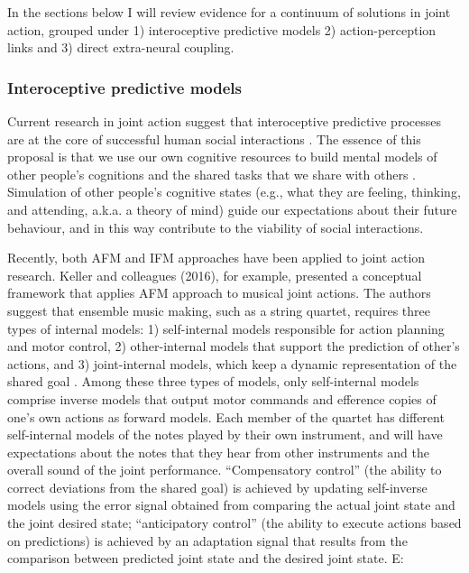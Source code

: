 \begin{CJK}{UTF8}{gbsn}
In the sections below I will review evidence for a continuum of solutions in joint action, grouped under 1) interoceptive predictive models 2) action-perception links and 3) direct extra-neural coupling.


\subsubsection{Interoceptive predictive models\label{sect:interoceptiveModelling}}
Current research in joint action suggest that interoceptive predictive processes are at the core of successful human social interactions \citep{Graziano2013,Manera2013,Sparenberg2012,Springer2012}.  The essence of this proposal is that we use our own cognitive resources to build mental models of other people’s cognitions and the shared tasks that we share with others \citep{Tomasello2005a}.  Simulation of other people’s cognitive states (e.g., what they are feeling, thinking, and attending, a.k.a. a theory of mind) guide our expectations about their future behaviour, and in this way contribute to the viability of social interactions.

Recently, both AFM and IFM approaches have been applied to joint action research.  Keller and colleagues (2016), for example, presented a conceptual framework that applies AFM approach to musical joint actions.  The authors suggest that ensemble music making, such as a string quartet, requires three types of internal models:
1) self-internal models responsible for action planning and motor control, 2) other-internal models that support the prediction of other’s actions, and 3) joint-internal models, which keep a dynamic representation of the shared goal \citep{Keller2016}.  Among these three types of models, only self-internal models comprise inverse models that output motor commands and efference copies of one’s own actions as forward models.  Each member of the quartet has different self-internal models of the notes played by their own instrument, and will have expectations about the notes that they hear from other instruments and the overall sound of the joint performance.  ``Compensatory control'' (the ability to correct deviations from the shared goal) is achieved by updating self-inverse models using the error signal obtained from comparing the actual joint state and the joint desired state; ``anticipatory control'' (the ability to execute actions based on predictions) is achieved by an adaptation signal that results from the comparison between predicted joint state and the desired joint state.
E:


\end{CJK}
